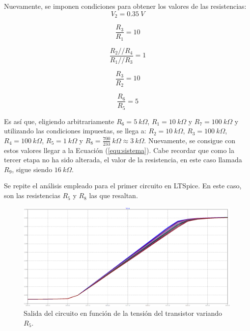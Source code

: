 \documentclass[a4paper]{article}
\begin{document}
Nuevamente, se imponen condiciones para obtener los valores de las resistencias:
\begin{equation}
	V_2 = 0.35 \ V
	\label{equ:condm2-1}
\end{equation}

\begin{equation}
	\frac{R_3}{R_1} = 10
	\label{equ:condm2-2}
\end{equation}

\begin{equation}
	\frac{R_2 // R_4}{R_1 // R_3} = 1
	\label{equ:condm3-3}
\end{equation}

\begin{equation}
	\frac{R_3}{R_2} = 10
	\label{equ:condm2-4}
\end{equation}

\begin{equation}
	\frac{R_6}{R_5} = 5
	\label{equ:condm2-5}
\end{equation}

Es así que, eligiendo arbitrariamente $R_6 = 5 \ k\Omega$, $R_1 = 10 \ k\Omega$ y $R_7 = 100 \ k\Omega$ y utilizando las condiciones impuestas, se llega a: $R_2 = 10 \ k\Omega$, $R_3 = 100 \ k\Omega$, $R_4 = 100 \ k\Omega$, $R_5 = 1 \ k\Omega$ y $R_8 = \frac{700}{233} \ k\Omega \approx 3 \ k\Omega$. Nuevamente, se consigue con estos valores llegar a la Ecuación (\ref{equ:sistema}). Cabe recordar que como la tercer etapa no ha sido alterada, el valor de la resistencia, en este caso llamada $R_9$, sigue siendo $16 \ k\Omega$.

Se repite el análisis empleado para el primer circuito en LTSpice. En este caso, son las resistencias $R_5$ y $R_8$ las que resaltan.

\begin{figure}[H]
	\centering
	\includegraphics[width=0.99\textwidth]{Ejercicio6/Imagenes/StepR5-M2.png}
	\caption{Salida del circuito en función de la tensión del transistor variando $R_5$.}
	\label{fig:r5-M2}
\end{figure}
\end{document}
